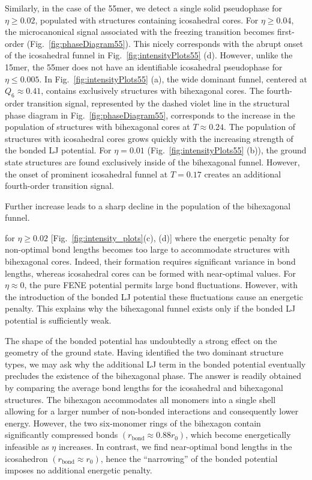 \documentclass[12pt]{report}
\begin{document}
%
Similarly, in the case of the 55mer, we detect a single solid pseudophase for $\eta \geq 0.02$, populated with structures containing icosahedral cores. For $\eta \geq 0.04$, the microcanonical signal associated with the freezing transition becomes first-order (Fig.~\ref{fig:phaseDiagram55}). This nicely corresponds with the abrupt onset of the icosahedral funnel in Fig.~\ref{fig:intensityPlots55} (d). However, unlike the 15mer, the 55mer does not have an identifiable icosahedral pseudophase for $\eta \leq 0.005$. In Fig.~\ref{fig:intensityPlots55} (a), the wide dominant funnel, centered at $Q_{6}\approx 0.41$, contains exclusively structures with bihexagonal cores. The fourth-order transition signal, represented by the dashed violet line in the structural phase diagram in Fig.~\ref{fig:phaseDiagram55}, corresponds to the increase in the population of structures with bihexagonal cores at $T \approx 0.24$. The population of structures with icosahedral cores grows quickly with the increasing strength of the bonded LJ potential. For $\eta = 0.01$ (Fig.~\ref{fig:intensityPlots55} (b)), the ground state structures are found exclusively inside of the bihexagonal funnel. However, the onset of prominent icosahedral funnel at $T = 0.17$ creates an additional fourth-order transition signal. 
%   

Further increase leads to a sharp decline in the population of the bihexagonal funnel. 

for $\eta \geq 0.02$ [Fig.~\ref{fig:intensity_plots}(c), (d)] where the energetic penalty for non-optimal bond lengths becomes too large to accommodate structures with bihexagonal cores. Indeed, their formation requires significant variance in bond lengths, whereas icosahedral cores can be formed with near-optimal values. For $\eta\approx 0$, the pure FENE potential permits large bond fluctuations. However, with the introduction of the bonded LJ potential these fluctuations cause an energetic penalty. This explains why the bihexagonal funnel exists only if the bonded LJ potential is sufficiently weak. 

%
The shape of the bonded potential has undoubtedly a strong effect on
the geometry of the ground state. Having identified the two dominant
structure types, we may ask why the additional LJ term in the bonded
potential eventually precludes the existence of the bihexagonal phase. The
answer is readily obtained by comparing the average bond lengths for the
icosahedral and bihexagonal structures. The bihexagon accommodates all
monomers into a single shell allowing for a larger number of non-bonded
interactions and consequently lower energy. However, the two six-monomer
rings of the bihexagon contain significantly compressed bonds
$(r_{\mathrm{bond}} \approx 0.88 r_{0})$, which become energetically
infeasible as $\eta$ increases. In contrast, we find near-optimal bond
lengths in the icosahedron $(r_{\mathrm{bond}} \approx  r_{0})$, hence the
``narrowing'' of the bonded potential imposes no additional energetic
penalty.
\end{document}
